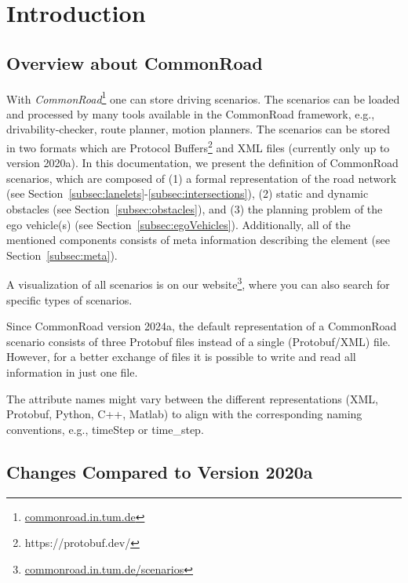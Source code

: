 
\section{Introduction}
\label{sec:introduction}
\subsection{Overview about CommonRoad}
With \textit{CommonRoad}\cite{Althoff2017a}\footnote{\href{https://commonroad.in.tum.de}{commonroad.in.tum.de}} one can store driving scenarios. The scenarios can be loaded and processed by many tools available in the CommonRoad framework, e.g., drivability-checker, route planner, motion planners.
The scenarios can be stored in two formats which are Protocol Buffers\footnote{https://protobuf.dev/} and XML files (currently only up to version 2020a).
In this documentation, we present the definition of CommonRoad scenarios, which are composed of (1) a formal representation of the road network (see Section~\ref{subsec:lanelets}-\ref{subsec:intersections}), (2) static and dynamic obstacles (see Section~\ref{subsec:obstacles}), and (3) the planning problem of the ego vehicle(s) (see Section~\ref{subsec:egoVehicles}).
Additionally, all of the mentioned components consists of meta information describing the element (see Section~\ref{subsec:meta}).

A visualization of all scenarios is on our website\footnote{\href{https://commonroad.in.tum.de/scenarios/}{commonroad.in.tum.de/scenarios}}, where you can also search for specific types of scenarios.

Since CommonRoad version 2024a, the default representation of a CommonRoad scenario consists of three Protobuf files instead of a  single (Protobuf/XML) file.
However, for a better exchange of files it is possible to write and read all information in just one file.

The attribute names might vary between the different representations (XML, Protobuf, Python, C++, Matlab) to align with the corresponding naming conventions, e.g., timeStep or time\_step.


\subsection{Changes Compared to Version 2020a}

